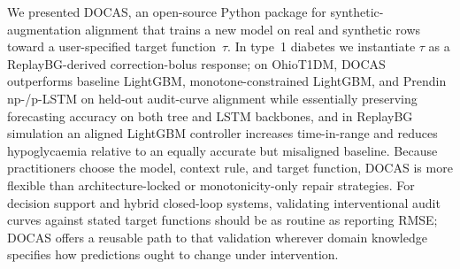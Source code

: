 \documentclass[a4paper,fleqn]{cas-sc}
\begin{document}
We presented DOCAS, an open-source Python package for synthetic-augmentation
alignment that trains a new model on real and synthetic rows toward a
user-specified target function~$\tau$. In type~1 diabetes we instantiate
$\tau$ as a ReplayBG-derived correction-bolus response; on OhioT1DM, DOCAS
outperforms baseline LightGBM, monotone-constrained LightGBM, and Prendin
np-/p-LSTM on held-out audit-curve alignment while essentially preserving
forecasting accuracy on both tree and LSTM backbones, and in ReplayBG
simulation an aligned LightGBM controller increases time-in-range and reduces
hypoglycaemia relative to an equally accurate but misaligned baseline. Because
practitioners choose the model, context rule, and target function, DOCAS is
more flexible than architecture-locked or monotonicity-only repair strategies.
For decision support and hybrid closed-loop systems, validating interventional
audit curves against stated target functions should be as routine as reporting
RMSE; DOCAS offers a reusable path to that validation wherever domain knowledge
specifies how predictions ought to change under intervention.



\end{document}
